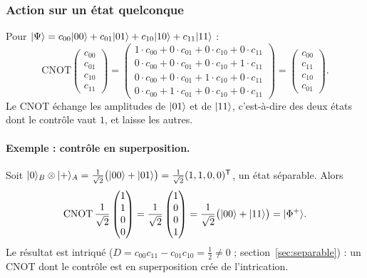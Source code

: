 \subsubsection{Action sur un état quelconque}

Pour $|\Psi\rangle=c_{00}|00\rangle+c_{01}|01\rangle+c_{10}|10\rangle+c_{11}|11\rangle$ :
\[
  \mathrm{CNOT}\begin{pmatrix}c_{00}\\c_{01}\\c_{10}\\c_{11}\end{pmatrix}
  =\begin{pmatrix}
    1\cdot c_{00}+0\cdot c_{01}+0\cdot c_{10}+0\cdot c_{11}\\
    0\cdot c_{00}+0\cdot c_{01}+0\cdot c_{10}+1\cdot c_{11}\\
    0\cdot c_{00}+0\cdot c_{01}+1\cdot c_{10}+0\cdot c_{11}\\
    0\cdot c_{00}+1\cdot c_{01}+0\cdot c_{10}+0\cdot c_{11}
  \end{pmatrix}
  =\begin{pmatrix}c_{00}\\c_{11}\\c_{10}\\c_{01}\end{pmatrix}.
\]
Le CNOT échange les amplitudes de $|01\rangle$ et de $|11\rangle$, c'est-à-dire des deux états
dont le contrôle vaut $1$, et laisse les autres.

\paragraph{Exemple : contrôle en superposition.} Soit $|0\rangle_B\otimes|+\rangle_A
=\frac{1}{\sqrt2}\big(|00\rangle+|01\rangle\big)=\frac{1}{\sqrt2}(1,1,0,0)^{\mathsf T}$,
un état séparable. Alors
\[
  \mathrm{CNOT}\,\frac{1}{\sqrt2}\begin{pmatrix}1\\1\\0\\0\end{pmatrix}
  =\frac{1}{\sqrt2}\begin{pmatrix}1\\0\\0\\1\end{pmatrix}
  =\frac{1}{\sqrt2}\big(|00\rangle+|11\rangle\big)=|\Phi^+\rangle.
\]
Le résultat est intriqué ($D=c_{00}c_{11}-c_{01}c_{10}=\frac12\neq0$ ; section~\ref{sec:separable}) :
un CNOT dont le contrôle est en superposition crée de l'intrication.

